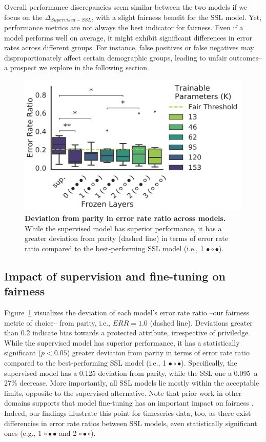 \documentclass[letterpaper]{article} %
\begin{document}
Overall performance discrepancies seem similar between the two models if we focus on the $\Delta_{Supervised-SSL}$, with a slight fairness benefit for the SSL model. Yet, performance metrics are not always the best indicator for fairness. Even if a model performs well on average, it might exhibit significant differences in error rates across different groups. For instance, false positives or false negatives may disproportionately affect certain demographic groups, leading to unfair outcomes--a prospect we explore in the following section.

\begin{figure}[htb!]
    \centering
    \includegraphics[width=.9\linewidth]{img/fairnessMetrics-all-error_rate_ratio.pdf}
    \caption{\textbf{Deviation from parity in error rate ratio across models.} While the supervised model has superior performance, it has a greater deviation from parity (dashed line) in terms of error rate ratio compared to the best-performing SSL model (i.e., 1 $\bullet\circ\bullet$).}
    \label{fig:mimic_fairness}
    \vspace{-0.5cm}
\end{figure}
\subsection{Impact of supervision and fine-tuning on fairness}\label{fairness-evaluation}
Figure~\ref{fig:mimic_fairness} visualizes the deviation of each model's error rate ratio --our fairness metric of choice-- from parity, i.e., $ERR=1.0$ (dashed line). Deviations greater than 0.2 indicate bias towards a protected attribute, irrespective of priviledge. While the supervised model has superior performance, it has a statistically significant ($p<0.05$) greater deviation from parity in terms of error rate ratio compared to the best-performing SSL model (i.e., 1 $\bullet\circ\bullet$). Specifically, the supervised model has a 0.125 deviation from parity, while the SSL one a 0.095--a 27\% decrease.
More importantly, all SSL models lie mostly within the acceptable limits, opposite to the supervised alternative. Note that prior work in other domains supports that model fine-tuning has an important impact on fairness \cite{ramapuram2021evaluating, rani2023self}. Indeed, our findings illustrate this point for timeseries data, too, as there exist differencies in error rate ratios between SSL models, even statistically significant ones (e.g.,  1 $\circ\bullet\bullet$ and 2 $\circ\bullet\circ$).
\end{document}

